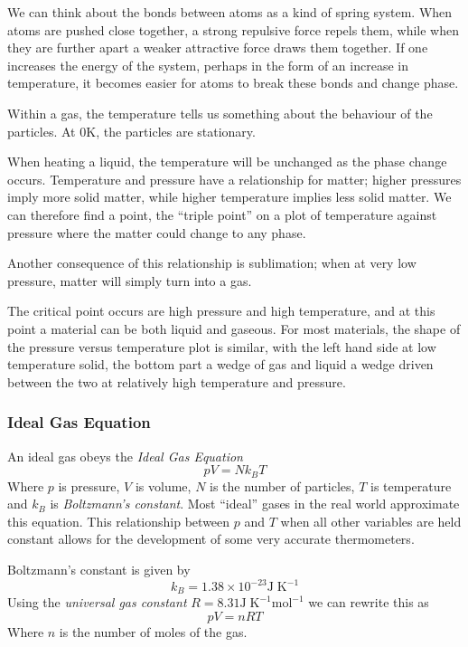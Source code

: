 \documentclass[12pt]{report}
\begin{document}
\begin{flushleft}
We can think about the bonds between atoms as a kind of spring system. When
atoms are pushed close together, a strong repulsive force repels them, while
when they are further apart a weaker attractive force draws them together.
If one increases the energy of the system, perhaps in the form of an increase
in temperature, it becomes easier for atoms to break these bonds and change
phase. \par
Within a gas, the temperature tells us something about the behaviour of the
particles. At \(0\mathrm{K}\), the particles are stationary. \par
When heating a liquid, the temperature will be unchanged as the phase change
occurs. Temperature and pressure have a relationship for matter; higher
pressures imply more solid matter, while higher temperature implies less solid
matter. We can therefore find a point, the ``triple point'' on a plot of
temperature against pressure where the matter could change to any phase. \par
Another consequence of this relationship is sublimation; when at very low
pressure, matter will simply turn into a gas. \par
The critical point occurs are high pressure and high temperature, and at this
point a material can be both liquid and gaseous. For most materials, the shape
of the pressure versus temperature plot is similar, with the left hand side at
low temperature solid, the bottom part a wedge of gas and liquid a wedge driven
between the two at relatively high temperature and pressure.

\subsubsection*{Ideal Gas Equation}

An ideal gas obeys the \textit{Ideal Gas Equation}
\[pV = Nk_BT\]
Where \(p\) is pressure, \(V\) is volume, \(N\) is the number of particles,
\(T\) is temperature and \(k_B\) is \textit{Boltzmann's constant}. Most
``ideal'' gases in the real world approximate this equation. This relationship
between \(p\) and \(T\) when all other variables are held constant allows for
the development of some very accurate thermometers. \par
Boltzmann's constant is given by
\[k_B = 1.38\times10^{-23}\mathrm{J\;K}^{-1}\]
Using the \textit{universal gas constant}
\(R = 8.31 \mathrm{J\;K^{-1}mol^{-1}}\) we can rewrite this as
\[pV = nRT\]
Where \(n\) is the number of moles of the gas.


\end{flushleft}
\end{document}
